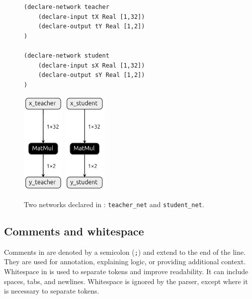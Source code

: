 \begin{figure}[h!]
    \begin{minipage}[c]{0.6\textwidth}
        \begin{lstlisting}[style=lbnf]
(declare-network teacher
    (declare-input tX Real [1,32])
    (declare-output tY Real [1,2])
)

(declare-network student
    (declare-input sX Real [1,32])
    (declare-output sY Real [1,2])
)\end{lstlisting}
    \end{minipage}
    \begin{minipage}[c]{0.4\textwidth}
        \centering
        \includegraphics[height=5cm]{imgs/teacher_net.onnx.png}
        \vspace{0.5cm} 
        \includegraphics[height=5cm]{imgs/student_net.onnx.png}
    \end{minipage}
    \caption{Two networks declared in \vnnlib{}: \texttt{teacher\_net} and \texttt{student\_net}.}
    \label{fig:multiple-networks}
\end{figure}


\subsection{Comments and whitespace}

Comments in \vnnlib{} are denoted by a semicolon (\texttt{;}) and extend to the end of the line. They are used for annotation, explaining logic, or providing additional context. Whitespace in \vnnlib{} is used to separate tokens and improve readability. It can include spaces, tabs, and newlines. Whitespace is ignored by the parser, except where it is necessary to separate tokens.


